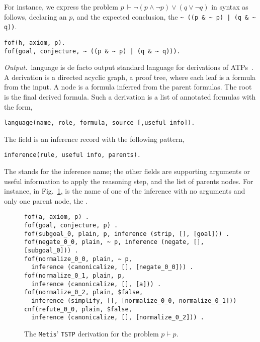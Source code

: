 \documentclass[../main.tex]{subfiles}
\begin{document}
For instance, we express the problem
$p\, \vdash \neg (p \wedge \neg p) \vee (q \vee \neg q)$
in \TPTP syntax as follows, declaring an \tptpaxiom $p$, and the expected
conclusion, the  \tptpconjecture \verb!~ ((p & ~ p) | (q & ~ q))!.

\begin{verbatim}
fof(h, axiom, p).
fof(goal, conjecture, ~ ((p & ~ p) | (q & ~ q))).
\end{verbatim}

\textit{Output.}~\TSTP language is de facto output standard language
for derivations of ATPs~\cite{sutcliffe2004tstp}.
A \TSTP derivation is a directed acyclic graph, a proof tree, where each leaf
is a formula from the \TPTP input. A node is a formula inferred from the parent
formulas. The root is the final derived formula. Such a derivation is a list of
annotated formulas with the form,

\begin{verbatim}
language(name, role, formula, source [,useful info]).
\end{verbatim}

The  field is an inference record with the following pattern,
\begin{verbatim}
inference(rule, useful info, parents).
\end{verbatim}

The  stands for the inference name; the other fields are
supporting arguments or useful information to apply the reasoning step, and
the list of parents nodes.
For instance, in Fig.~\ref{fig:metis-proof-tstp}, \strip is the name of one
of the inference with no arguments and only one parent node, the .

\begin{figure}
\begin{verbatim}
fof(a, axiom, p) .
fof(goal, conjecture, p) .
fof(subgoal_0, plain, p, inference (strip, [], [goal])) .
fof(negate_0_0, plain, ~ p, inference (negate, [], [subgoal_0])) .
fof(normalize_0_0, plain, ∼ p,
  inference (canonicalize, [], [negate_0_0])) .
fof(normalize_0_1, plain, p,
  inference (canonicalize, [], [a])) .
fof(normalize_0_2, plain, $false,
  inference (simplify, [], [normalize_0_0, normalize_0_1]))
cnf(refute_0_0, plain, $false,
  inference (canonicalize, [], [normalize_0_2])) .
\end{verbatim}
\caption{The \texttt{Metis}' \texttt{TSTP} derivation for the problem $p\vdash p$.}
\label{fig:metis-proof-tstp}
\end{figure}
\end{document}
